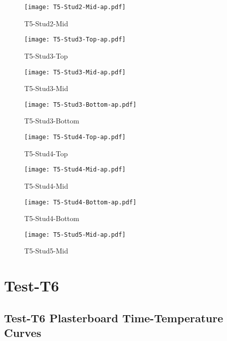 \begin{figure}[htbp]
	\centering
			\texttt{[image: T5-Stud2-Mid-ap.pdf]}
			\caption*{T5-Stud2-Mid}
\end{figure}
\begin{figure}[htbp]
	\centering
			\texttt{[image: T5-Stud3-Top-ap.pdf]}
			\caption*{T5-Stud3-Top}
\end{figure}
\begin{figure}[htbp]
	\centering
			\texttt{[image: T5-Stud3-Mid-ap.pdf]}
			\caption*{T5-Stud3-Mid}
\end{figure}
\begin{figure}[htbp]
	\centering
			\texttt{[image: T5-Stud3-Bottom-ap.pdf]}
			\caption*{T5-Stud3-Bottom}
\end{figure}
\begin{figure}[htbp]
	\centering
			\texttt{[image: T5-Stud4-Top-ap.pdf]}
			\caption*{T5-Stud4-Top}
\end{figure}
\begin{figure}[htbp]
	\centering
			\texttt{[image: T5-Stud4-Mid-ap.pdf]}
			\caption*{T5-Stud4-Mid}
\end{figure}
\begin{figure}[htbp]
	\centering
			\texttt{[image: T5-Stud4-Bottom-ap.pdf]}
			\caption*{T5-Stud4-Bottom}
\end{figure}
\begin{figure}[htbp]
	\centering
			\texttt{[image: T5-Stud5-Mid-ap.pdf]}
			\caption*{T5-Stud5-Mid}
\end{figure}

\pagebreak

\section*{Test-T6}
\subsection*{Test-T6 Plasterboard Time-Temperature Curves}

